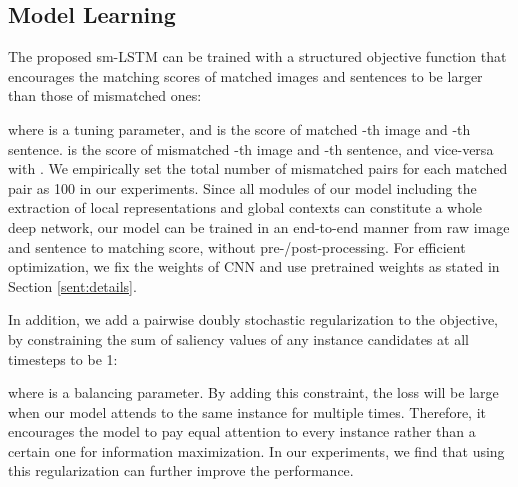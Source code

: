 \documentclass[10pt,twocolumn,letterpaper]{article}
\begin{document}
\subsection{Model Learning}

The proposed sm-LSTM can be trained with a structured objective function
that encourages the matching scores of matched images and sentences to be larger
than those of mismatched ones:

where  is a tuning parameter,
and  is the score of matched -th image and -th sentence.
 is the score of mismatched -th image and -th sentence,
and vice-versa with .
We empirically set the total number of mismatched pairs for each matched pair
as 100 in our experiments.
Since all modules of our model including the extraction of local representations
and global contexts can constitute a whole deep network,
our model can be trained in an end-to-end manner from raw image and sentence to matching score,
without pre-/post-processing.
For efficient optimization, we fix the weights of CNN and use pretrained weights
as stated in Section \ref{sent:details}.


In addition, we add a pairwise doubly stochastic regularization to the objective,
by constraining the sum of saliency values of any instance candidates at all timesteps to be 1:

where  is a balancing parameter.
By adding this constraint, the loss will be large
when our model attends to the same instance for multiple times.
Therefore, it encourages the model to pay equal attention to
every instance rather than a certain one for information maximization.
In our experiments, we find that using this regularization can further improve the performance.
\end{document}

